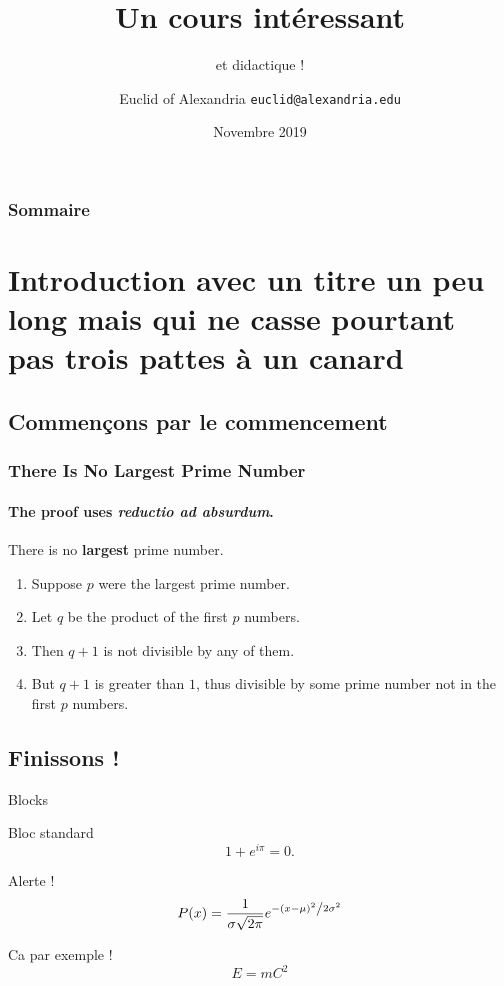 \documentclass[11pt]{beamer}
\title{Un cours intéressant}
\subtitle{et didactique !}
\date[2019]{Novembre 2019}
\author[Euclid]{Euclid of Alexandria \texttt{euclid@alexandria.edu}}
\institute{Département mathématique d'Alexandrie}
\begin{document}
\begin{frame}[plain]
\titlepage
\end{frame}

\begin{frame}
        \frametitle{Sommaire}
        \tableofcontents
\end{frame}


\section{Introduction avec un titre un peu long mais qui ne casse pourtant pas trois pattes à un canard}

\subsection{Commençons par le commencement}

\begin{frame} 
\frametitle{There Is No Largest Prime Number} 
\framesubtitle{The proof uses \textit{reductio ad absurdum}.} 
\begin{theorem}
	There is no \textbf{largest} prime number. \end{theorem} 
\begin{enumerate} 
	\item<1-| alert@1> Suppose $p$ were the largest prime number. 
	\item<2-> Let $q$ be the product of the first $p$ numbers. 
	\item<3-> Then $q+1$ is not divisible by any of them. 
	\item<1-> But $q + 1$ is greater than $1$, thus divisible by some prime
	number not in the first $p$ numbers.
\end{enumerate}
\end{frame}

\subsection{Finissons !}

\begin{frame}{Blocks}

\begin{block}{Bloc standard}
  $$1 + e^{i \pi} = 0.$$
\end{block}

\begin{alertblock}{Alerte !}
$$P(x) = \frac{1}{{\sigma \sqrt {2\pi } }}e^{{{ - \left( {x - \mu } \right)^2 } \mathord{\left/ {\vphantom {{ - \left( {x - \mu } \right)^2 } {2\sigma ^2 }}} \right. \kern-\nulldelimiterspace} {2\sigma ^2 }}}$$
\end{alertblock}
\begin{exampleblock}{Ca par exemple !}
  $$E = m C^2$$
\end{exampleblock}

\end{frame}
\end{document}
